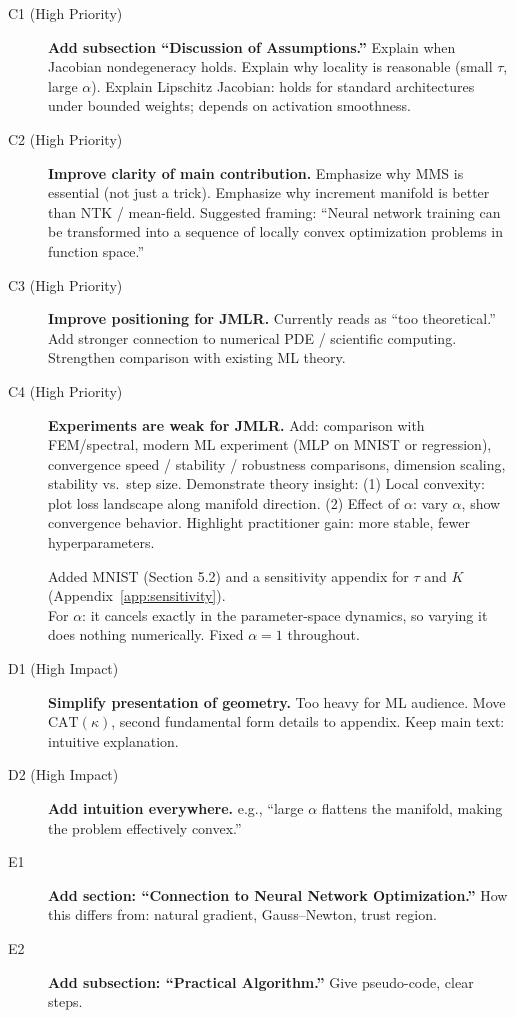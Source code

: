 \documentclass[twoside,11pt]{article}
\begin{document}
\begin{description}
\item[C1 (High Priority)] \textbf{Add subsection ``Discussion of Assumptions.''}
    Explain when Jacobian nondegeneracy holds.
    Explain why locality is reasonable (small $\tau$, large $\alpha$).
    Explain Lipschitz Jacobian: holds for standard architectures
    under bounded weights; depends on activation smoothness.

\item[C2 (High Priority)] \textbf{Improve clarity of main contribution.}
    Emphasize why MMS is essential (not just a trick).
    Emphasize why increment manifold is better than NTK / mean-field.
    Suggested framing: ``Neural network training can be transformed into
    a sequence of locally convex optimization problems in function space.''

\item[C3 (High Priority)] \textbf{Improve positioning for JMLR.}
    Currently reads as ``too theoretical.''
    Add stronger connection to numerical PDE / scientific computing.
    Strengthen comparison with existing ML theory.

\item[C4 (High Priority)] \textbf{Experiments are weak for JMLR.}
    Add: comparison with FEM/spectral, modern ML experiment (MLP on
    MNIST or regression), convergence speed / stability / robustness
    comparisons, dimension scaling, stability vs.\ step size.
    Demonstrate theory insight:
    (1) Local convexity: plot loss landscape along manifold direction.
    (2) Effect of $\alpha$: vary $\alpha$, show convergence behavior.
    Highlight practitioner gain: more stable, fewer hyperparameters.


{\color{blue} Added MNIST (Section 5.2) and a sensitivity appendix for $\tau$ and 
$K$ (Appendix~\ref{app:sensitivity}). \\
For $\alpha$: it cancels exactly in the parameter-space dynamics, so varying it does nothing numerically. 
Fixed $\alpha=1$ throughout. \\
} 

\item[D1 (High Impact)] \textbf{Simplify presentation of geometry.}
    Too heavy for ML audience.
    Move $\mathrm{CAT}(\kappa)$, second fundamental form details to appendix.
    Keep main text: intuitive explanation.

\item[D2 (High Impact)] \textbf{Add intuition everywhere.}
    e.g., ``large $\alpha$ flattens the manifold, making the problem effectively convex.''

\item[E1] \textbf{Add section: ``Connection to Neural Network Optimization.''}
    How this differs from: natural gradient, Gauss--Newton, trust region.

\item[E2] \textbf{Add subsection: ``Practical Algorithm.''}
    Give pseudo-code, clear steps.
\end{description}
\end{document}
